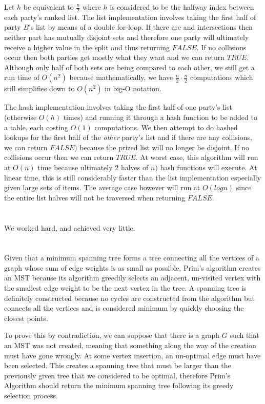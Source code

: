 \documentclass[12pt]{article}
\begin{document}
\noindent Let \(h\) be equivalent to \(\frac{n}{2}\) where \(h\) is considered to be the halfway index between each party's ranked list. The list implementation involves taking the first half of party \(B\)'s list by means of a double for-loop. If there are and intersections then neither part has mutually disjoint sets and therefore one party will ultimately receive a higher value in the split and thus returning \(FALSE\). If no collisions occur then both parties get mostly what they want and we can return \(TRUE\). Although only half of both sets are being compared to each other, we still get a run time of \(O(n^2)\) because mathematically, we have \(\frac{n}{2}\cdot\frac{n}{2}\) computations which still simplifies down to \(O(n^2)\) in big-O notation.\newline

\noindent The hash implementation involves taking the first half of one party's list (otherwise \(O(h)\) times) and running it through a hash function to be added to a table, each costing \(O(1)\) computations. We then attempt to do hashed lookups for the first half of the \textit{other} party's list and if there are any collisions, we can return \(FALSE)\) because the prized list will no longer be disjoint. If no collisions occur then we can return \(TRUE\). At worst case, this algorithm will run at \(O(n)\) time because ultimately 2 halves of \(n)\) hash functions will execute. At linear time, this is still considerably faster than the list implementation especially given large sets of items. The average case however will run at \(O(logn)\) since the entire list halves will not be traversed when returning \(FALSE\). 

\section{}
We worked hard, and achieved very little.

\section{}
Given that a minimum spanning tree forms a tree connecting all the vertices of a graph whose sum of edge weights is as small as possible, Prim's algorithm creates an MST because its algorithm greedily selects an adjacent, un-visited vertex with the smallest edge weight to be the next vertex in the tree. A spanning tree is definitely constructed because no cycles are constructed from the algorithm but connects all the vertices and is considered minimum by quickly choosing the closest points.\newline

\noindent To prove this by contradiction, we can suppose that there is a graph \(G\) such that an MST was not created, meaning that something along the way of the creation must have gone wrongly. At some vertex insertion, an un-optimal edge must have been selected. This creates a spanning tree that must be larger than the previously given tree that we considered to be optimal, therefore Prim's Algorithm should return the minimum spanning tree following its greedy selection process.
\end{document}
